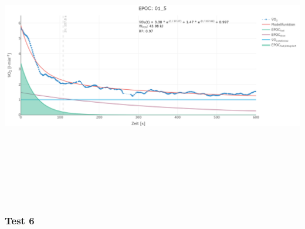 \documentclass[
  letterpaper,
  DIV=11]{scrartcl}
\begin{document}
\includegraphics[width=11.45833in,height=4.6875in]{images/01_5.png}

\subsubsection{Test 6}
\end{document}
